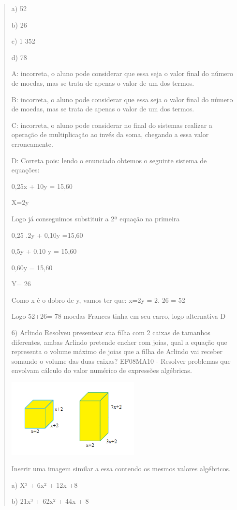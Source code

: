 \begin{quote}
\begin{escolha}
a) 52

b) 26

c) 1 352

d) 78

A: incorreta, o aluno pode considerar que essa seja o valor final do
número de moedas, mas se trata de apenas o valor de um dos termos.

B: incorreta, o aluno pode considerar que essa seja o valor final do
número de moedas, mas se trata de apenas o valor de um dos termos.

C: incorreta, o aluno pode considerar no final do sistemas realizar a
operação de multiplicação ao invés da soma, chegando a essa valor
erroneamente.

D: Correta pois: lendo o enunciado obtemos o seguinte sistema de
equações:

0,25x + 10y = 15,60

X=2y

Logo já conseguimos substituir a 2ª equação na primeira

0,25 .2y + 0,10y =15,60

0,5y + 0,10 y = 15,60

0,60y = 15,60

Y= 26

Como x é o dobro de y, vamos ter que: x=2y = 2. 26 = 52

Logo 52+26= 78 moedas Frances tinha em seu carro, logo alternativa D

6) Arlindo Resolveu presentear sua filha com 2 caixas de tamanhos
diferentes, ambas Arlindo pretende encher com joias, qual a equação que
representa o volume máximo de joias que a filha de Arlindo vai receber
somando o volume das duas caixas? EF08MA10 - Resolver problemas que
envolvam cálculo do valor numérico de expressões algébricas.

\includegraphics[width=2.63333in,height=1.56545in]{./imgSAEB_8_MAT/media/image55.png}

Inserir uma imagem similar a essa contendo os mesmos valores algébricos.

a) X³ + 6x² + 12x +8

b) 21x³ + 62x² + 44x + 8


\end{escolha}
\end{quote}

